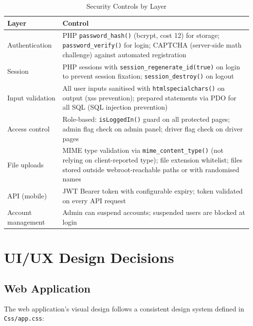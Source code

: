 \documentclass[12pt,a4paper,openright]{report}
\begin{document}
\begin{table}[H]
\centering
\caption{Security Controls by Layer}
\label{tab:security}
\begin{tabularx}{\textwidth}{l X}
\toprule
\textbf{Layer} & \textbf{Control} \\
\midrule
Authentication & PHP \texttt{password\_hash()} (bcrypt, cost 12) for storage; \texttt{password\_verify()} for login; CAPTCHA (server-side math challenge) against automated registration \\
Session & PHP sessions with \texttt{session\_regenerate\_id(true)} on login to prevent session fixation; \texttt{session\_destroy()} on logout \\
Input validation & All user inputs sanitised with \texttt{htmlspecialchars()} on output (\gls{xss} prevention); prepared statements via PDO for all SQL (SQL injection prevention) \\
Access control & Role-based: \texttt{isLoggedIn()} guard on all protected pages; admin flag check on admin panel; driver flag check on driver pages \\
File uploads & MIME type validation via \texttt{mime\_content\_type()} (not relying on client-reported type); file extension whitelist; files stored outside webroot-reachable paths or with randomised names \\
API (mobile) & JWT Bearer token with configurable expiry; token validated on every API request \\
Account management & Admin can suspend accounts; suspended users are blocked at login \\
\bottomrule
\end{tabularx}
\end{table}

\section{UI/UX Design Decisions}

\subsection{Web Application}

The web application's visual design follows a consistent design system defined in \texttt{Css/app.css}:
\end{document}
